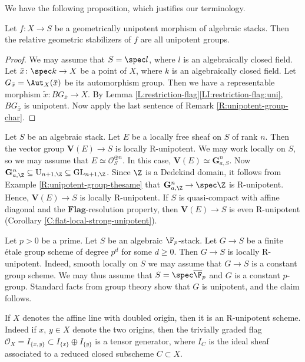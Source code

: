 \documentclass[reqno,a4paper]{amsart}
\numberwithin{Theorem}{section}
\newcommand{\Orb}{\mathcal{O}}
\renewcommand{\GL}{\mathrm{GL}}
\renewcommand{\U}{\mathrm{U}}
\newcommand{\Flag}{\mathbf{Flag}}
\theoremstyle{plain}
\theoremstyle{remark}
\newcommand{\classB}{B}
\begin{document}
We have the following proposition, which justifies our terminology.
\begin{proposition}\label{P:stabilizer-geom-unipotent}
  Let $f \colon X \to S$ be a geometrically unipotent morphism of
  algebraic stacks. Then the relative geometric stabilizers of $f$ are all
  unipotent groups. 
\end{proposition}
\begin{proof}
  We may assume that $S=\spec l$, where $l$ is an algebraically closed
  field. Let $\bar{x}\colon \spec k \to X$ be a point of $X$, where
  $k$ is an algebraically closed field. Let
  $G_{\bar{x}} = \Aut_X(\bar{x})$ be its automorphism group. Then we
  have a representable morphism
  $\tilde{x} \colon \classB G_{\bar{x}} \to X$. By Lemma
  \ref{L:restriction-flag}\eqref{LI:restriction-flag:uni},
  $\classB G_{\bar{x}}$ is unipotent. Now apply the last sentence of Remark
  \ref{R:unipotent-group-char}. 
\end{proof}
\begin{Example}\label{E:vector-is-loc-unipotent}
  Let $S$ be an algebraic stack. Let $E$ be a locally free sheaf on $S$ of
  rank $n$. Then the vector group $\mathbf{V}(E) \to S$ is locally
  R-unipotent. We may work locally on $S$, so we may assume that
  $E\simeq \Orb_{S}^{\oplus n}$. In this case,
  $\mathbf{V}(E) \simeq \mathbf{G}_{a,S}^n$. Now
  $\mathbf{G}_{a,\Z}^n \subseteq \U_{n+1,\Z} \subseteq
  \GL_{n+1,\Z}$. Since $\Z$ is a Dedekind domain, it follows from Example
  \ref{R:unipotent-group-thesame} that
  $\mathbf{G}_{a,\Z}^n \to \spec \Z$ is R-unipotent. Hence,
  $\mathbf{V}(E) \to S$ is locally R-unipotent. If $S$ is
  quasi-compact with affine diagonal and the $\Flag$-resolution property, then
  $\mathbf{V}(E) \to S$ is even R-unipotent (Corollary
  \ref{C:flat-local-strong-unipotent}).
\end{Example}
\begin{Example}\label{E:pgroup}
  Let $p>0$ be a prime. Let $S$ be an algebraic $\F_p$-stack. Let
  $G \to S$ be a finite \'etale group scheme of degree $p^d$ for some
  $d\geq 0$. Then $G \to S$ is locally R-unipotent. Indeed, smooth
  locally on $S$ we may assume that $G \to S$ is a constant group
  scheme. We may thus assume that $S=\spec \overline{\F}_p$ and $G$ is a
  constant $p$-group. Standard facts from group theory show that $G$
  is unipotent, and the claim follows.
\end{Example}

\begin{Example} \label{E:nonseparatedline} If $X$ denotes the affine
  line with doubled origin, then it is an R-unipotent scheme. Indeed
  if $x$, $y \in X$ denote the two origins, then the trivially graded
  flag $\mathcal{O}_X=I_{\{x,y\}} \subset I_{\{x\}} \oplus I_{\{y\}}$
  is a tensor generator, where $I_C$ is the ideal sheaf associated to
  a reduced closed subscheme $C \subset X$.
\end{Example}
\end{document}
